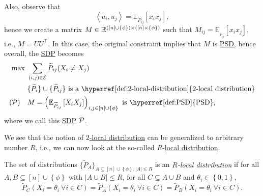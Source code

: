 Also, observe that
\[
	\left\langle u_i, u_j \right\rangle = \mathbb{E}_{\widetilde{P} _{ij}}\left[ x_i x_j\right],
\]
hence we create a matrix \(M\in \mathbb{\MakeUppercase{r}} ^{([n] \cup \left\{ \phi  \right\} )\times ([n] \times \left\{ \phi  \right\} )}\) such that \(M_{ij} = \mathbb{E}_{_{\widetilde{P} _{ij}}}\left[ x_i x_j\right] \), i.e., \(M = U U ^{\top} \). In this case, the original constraint implies that \(M\) is \hyperref[def:PSD]{PSD}, hence overall, the \hyperref[def:SDP]{SDP} becomes
\[
	\begin{aligned}
		\max~                               & \sum_{(i, j)\in \mathcal{\MakeUppercase{e}} } \widetilde{P} _{ij} (X_i \neq X_j)                                                                       \\
		                                    & \{\widetilde{P} _i\}\cup \{\widetilde{P} _{ij}\}\text{ is a \hyperref[def:2-local-distribution]{\(2\)-local distribution}}                             \\
		(\mathcal{\MakeUppercase{p}} )\quad & M = \left( \mathbb{E}_{\widetilde{P} _{ij}}\left[X_i X_j \right] \right) _{i, j\in [n]\cup \left\{ \phi  \right\} }\text{ is \hyperref[def:PSD]{PSD}},
	\end{aligned}
\]
where we call this \hyperref[def:SDP]{SDP} \(\mathcal{\MakeUppercase{p}} \).

We see that the notion of \hyperref[def:2-local-distribution]{\(2\)-local distribution} can be generalized to arbitrary number \(R\), i.e., we can now look at the so-called \(R\)-\hyperref[def:local-distribution]{local distribution}.

\begin{definition}\label{def:local-distribution}
	The set of distributions \(\{ \widetilde{P} _A \}_{A \subseteq [n] \cup \left\{ \phi  \right\}, \left\vert A \right\vert \leq R} \) is an \emph{\(R\)-local distribution} if for all \(A, B \subseteq [n]\cup \left\{ \phi  \right\} \) with \(\left\vert A \cup B \right\vert \leq R\), for all \(C \subseteq A \cup B\) and \(\theta _i \in \left\{ 0, 1 \right\} \),
	\[
		\widetilde{P} _C (X_i = \theta _i\ \forall i\in C)
		= \widetilde{P} _A (X_i = \theta _i\ \forall i\in C)
		= \widetilde{P} _B (X_i = \theta _i\ \forall i\in C).
	\]
\end{definition}

